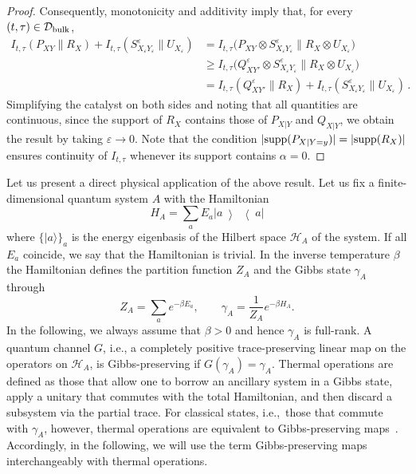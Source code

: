 \documentclass[aps,pra,11pt,onecolumn,nofootinbib,tightenlines]{revtex4-2}
\theoremstyle{definition}
\newcommand{\mc}[1]{\mathcal{#1}}
\newcommand{\ketbra}[2]{\left|#1\middle\rangle\middle\langle #2\right|}
\begin{document}
\begin{proof}
Consequently, monotonicity and additivity imply that, for every $(t,\tau)\in\mc D_{\rm bulk}$,
\begin{align}
I_{t,\tau}(P_{XY}\|R_X)
+I_{t,\tau}(S^\varepsilon_{X_\varepsilon Y_\varepsilon}\|U_{X_\varepsilon})
&=
I_{t,\tau}\bigl(
P_{XY}\otimes S^\varepsilon_{X_\varepsilon Y_\varepsilon}
\big\|
R_X\otimes U_{X_\varepsilon}
\bigr)
\\
&\geq
I_{t,\tau}\bigl(
Q^\varepsilon_{XY'}\otimes S^\varepsilon_{X_\varepsilon Y_\varepsilon}
\big\|
R_X\otimes U_{X_\varepsilon}
\bigr)
\\
&=
I_{t,\tau}(Q^\varepsilon_{XY'}\|R_X)
+
I_{t,\tau}(S^\varepsilon_{X_\varepsilon Y_\varepsilon}\|U_{X_\varepsilon})\,.
\end{align}
Simplifying the catalyst on both sides and noting that all quantities are continuous, since the support of $R_X$ contains those of $P_{X\vert Y}$ and $Q_{X\vert Y}$, we obtain the result by taking $\varepsilon \to 0$. Note that the condition $|{\rm supp}(P_{X|Y=y})|=|{\rm supp}(R_X)|$ ensures continuity of $I_{t,\tau}$ whenever its support contains $\alpha=0$.
\end{proof}

Let us present a direct physical application of the above result. Let us fix a finite-dimensional quantum system $A$ with the Hamiltonian
\begin{equation}
H_A=\sum_a E_a\ketbra{a}{a}
\end{equation}
where $\{|a\rangle\}_a$ is the energy eigenbasis of the Hilbert space $\mc H_A$ of the system. If all $E_a$ coincide, we say that the Hamiltonian is trivial. In the inverse temperature $\beta$ the Hamiltonian defines the partition function $Z_A$ and the Gibbs state $\gamma_A$ through
\begin{equation}
Z_A=\sum_a e^{-\beta E_a},\qquad \gamma_A=\frac{1}{Z_A}e^{-\beta H_A}.
\end{equation}
In the following, we always assume that $\beta>0$ and hence $\gamma_A$ is full-rank. A quantum channel $G$, i.e., a completely positive trace-preserving linear map on the operators on $\mc H_A$, is Gibbs-preserving if $G(\gamma_A)=\gamma_A$. Thermal operations are defined as those that allow one to borrow an ancillary system in a Gibbs state, apply a unitary that commutes with the total Hamiltonian, and then discard a subsystem via the partial trace. For classical states, i.e.,\ those that commute with $\gamma_A$, however, thermal operations are equivalent to Gibbs-preserving maps~\cite{janzing2000thermodynamic,horodecki2013fundamental}. Accordingly, in the following, we will use the term Gibbs-preserving maps interchangeably with thermal operations.
\end{document}
